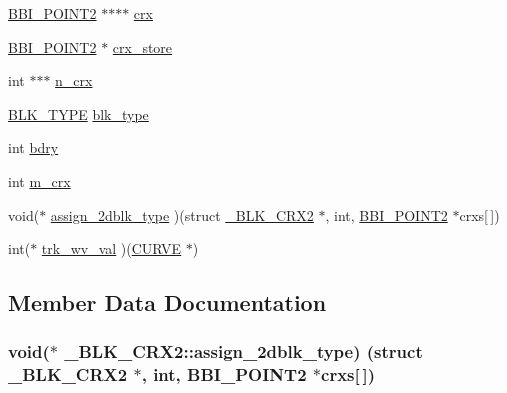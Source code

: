 \begin{DoxyCompactItemize}
\item 
\hyperlink{int_8h_af5d4b92af9cf081cdd52755562d2f5c5}{B\+B\+I\+\_\+\+P\+O\+I\+N\+T2} $\ast$$\ast$$\ast$$\ast$ \hyperlink{struct___b_l_k___c_r_x2_a5fd9d6418e32574aeed11c9856c402da}{crx}
\item 
\hyperlink{int_8h_af5d4b92af9cf081cdd52755562d2f5c5}{B\+B\+I\+\_\+\+P\+O\+I\+N\+T2} $\ast$ \hyperlink{struct___b_l_k___c_r_x2_aa7fb26d5bec2abcdbee21e868c0bc028}{crx\+\_\+store}
\item 
int $\ast$$\ast$$\ast$ \hyperlink{struct___b_l_k___c_r_x2_af4617bdff3827ee527b4f2d52020546c}{n\+\_\+crx}
\item 
\hyperlink{int_8h_ac45457625cd46b4046c5291c9d519d53}{B\+L\+K\+\_\+\+T\+Y\+PE} \hyperlink{struct___b_l_k___c_r_x2_a3848a13950d7696930cf521bbd2ac789}{blk\+\_\+type}
\item 
int \hyperlink{struct___b_l_k___c_r_x2_ac04c40354e9258e9d423d9cda6cefa46}{bdry}
\item 
int \hyperlink{struct___b_l_k___c_r_x2_aabf906c2bd60b8ba9a0509e75c718c7c}{m\+\_\+crx}
\item 
void($\ast$ \hyperlink{struct___b_l_k___c_r_x2_a077ef0b2c22d2077feea928b559c31a1}{assign\+\_\+2dblk\+\_\+type} )(struct \hyperlink{struct___b_l_k___c_r_x2}{\+\_\+\+B\+L\+K\+\_\+\+C\+R\+X2} $\ast$, int, \hyperlink{int_8h_af5d4b92af9cf081cdd52755562d2f5c5}{B\+B\+I\+\_\+\+P\+O\+I\+N\+T2} $\ast$crxs\mbox{[}$\,$\mbox{]})
\item 
int($\ast$ \hyperlink{struct___b_l_k___c_r_x2_af6a581f21f62bbd6a47826008dd679b6}{trk\+\_\+wv\+\_\+val} )(\hyperlink{int_8h_a4c1c272bef898dbaa20b055af85cd685}{C\+U\+R\+VE} $\ast$)
\end{DoxyCompactItemize}


\subsection{Member Data Documentation}
\subsubsection[{\texorpdfstring{assign\+\_\+2dblk\+\_\+type}{assign_2dblk_type}}]{\setlength{\rightskip}{0pt plus 5cm}void($\ast$ \+\_\+\+B\+L\+K\+\_\+\+C\+R\+X2\+::assign\+\_\+2dblk\+\_\+type) (struct {\bf \+\_\+\+B\+L\+K\+\_\+\+C\+R\+X2} $\ast$, int, {\bf B\+B\+I\+\_\+\+P\+O\+I\+N\+T2} $\ast$crxs\mbox{[}$\,$\mbox{]})}\hypertarget{struct___b_l_k___c_r_x2_a077ef0b2c22d2077feea928b559c31a1}{}\label{struct___b_l_k___c_r_x2_a077ef0b2c22d2077feea928b559c31a1}
